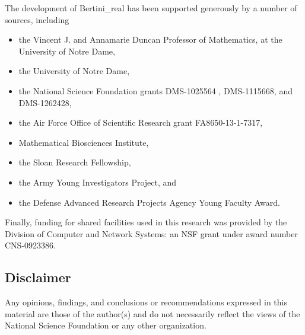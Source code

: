 The development of Bertini\_real has been supported generously by a number of sources, including 
\begin{itemize}[noitemsep]
\item the Vincent J. and Annamarie Duncan Professor of Mathematics, at the University of Notre Dame, 
\item the University of Notre Dame, 
\item the National Science Foundation grants DMS-1025564 , DMS-1115668, and DMS-1262428, 
\item the Air Force Office of Scientific Research grant FA8650-13-1-7317, 
\item Mathematical Biosciences Institute, 
\item the Sloan Research Fellowship, 
\item the Army Young Investigators Project, and 
\item the Defense Advanced Research Projects Agency Young Faculty Award.
\end{itemize}

Finally, funding for shared facilities used in this research was provided by the Division of Computer and Network Systems: an NSF grant under award number CNS-0923386.




\subsection*{Disclaimer}

Any opinions, findings, and conclusions or recommendations expressed in this material are those of the author(s) and do not necessarily reflect the views of the National Science Foundation or any other organization.
